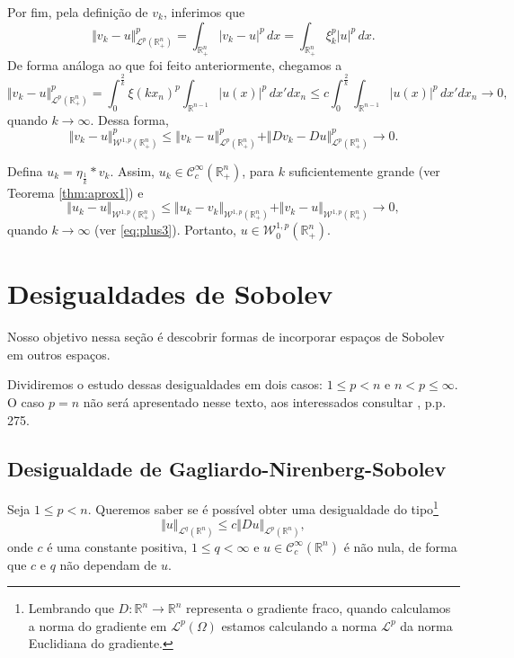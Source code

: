 \documentclass[a4paper, 11pt]{book}
\theoremstyle{definition}
\newcommand{\bR}{\mathbb{R}}
\newcommand{\cC}{\mathcal{C}}
\newcommand{\cL}{\mathcal{L}}
\newcommand{\cW}{\mathcal{W}}
\begin{document}
\begin{prf}
    Por fim, pela definição de $v_k$, inferimos que
    \[
        \Vert v_k - u \Vert_{\cL^p(\bR^n_+)}^p = \int_{\bR^n_+} |v_k - u|^p \,dx = \int_{\bR^n_+} \xi^p_k|u|^p \,dx.
    \]
    De forma análoga ao que foi feito anteriormente, chegamos a
    \begin{equation} \label{eq:plus3}
        \Vert v_k - u \Vert_{\cL^p(\bR^n_+)}^p = \int_{0}^{\frac{2}{k}} \xi(kx_n)^p \int_{\bR^{n-1}} |u(x)|^p \,dx'dx_n \leqslant c \int_{0}^{\frac{2}{k}} \int_{\bR^{n-1}} |u(x)|^p \, dx'dx_n \to 0,
    \end{equation}
    quando $k \to \infty$. Dessa forma,
    \[
        \Vert v_k - u \Vert_{\cW^{1,p}(\bR^n_+)}^p \leqslant \Vert v_k - u \Vert_{\cL^{p}(\bR^n_+)}^p + \Vert Dv_k - Du \Vert_{\cL^{p}(\bR^n_+)}^p \to 0.
    \]

    Defina $u_k = \eta_{\frac{1}{k}} * v_k$. Assim, $u_k \in \cC^{\infty}_c(\bR^n_+)$, para $k$ suficientemente grande (ver Teorema \ref{thm:aprox1}) e 
    \[
        \Vert u_k - u \Vert_{\cW^{1,p}(\bR^n_+)} \leqslant \Vert u_k - v_k \Vert_{\cW^{1,p}(\bR^n_+)} + \Vert v_k - u \Vert_{\cW^{1,p}(\bR^n_+)} \to 0,
    \]
    quando $k \to \infty$ (ver \ref{eq:plus3}).
    Portanto, $u \in \cW^{1,p}_0(\bR^n_+)$.
\end{prf}

\section{Desigualdades de Sobolev}

Nosso objetivo nessa seção é descobrir formas de incorporar espaços de Sobolev em outros espaços.

Dividiremos o estudo dessas desigualdades em dois casos: $1 \leqslant p < n$ e $n < p \leqslant \infty$.
O caso $p = n$ não será apresentado nesse texto, aos interessados consultar \cite{evans-pde}, p.p. 275.

\subsection{Desigualdade de Gagliardo-Nirenberg-Sobolev}

Seja $1 \leqslant p < n$.
Queremos saber se é possível obter uma desigualdade do tipo\footnote{
    Lembrando que $D : \bR^n \to \bR^n$ representa o gradiente fraco, quando calculamos a norma do gradiente em $\cL^p(\Omega)$ estamos calculando a norma $\cL^p$ da norma Euclidiana do gradiente.
}
\begin{equation} \label{eq:quase-gns}
    \Vert u \Vert_{\cL^q(\bR^n)} \leqslant c \Vert Du \Vert_{\cL^p(\bR^n)},
\end{equation}
onde $c$ é uma constante positiva, $1 \leqslant q < \infty$ e $u \in \cC^\infty_c(\bR^n)$ é não nula, de forma que $c$ e $q$ não dependam de $u$.
\end{document}

